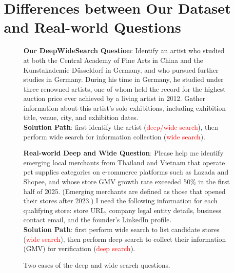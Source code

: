 \documentclass[11pt, letterpaper, logo, onecolumn, copyright, numbering]{paper_improved}
\begin{document}
\section{Differences between Our Dataset and Real-world Questions\label{subsec.limitation}}


\begin{figure}[htbp]
    \begin{tcolorbox}[
        title=Two Deep and Wide Questions,
        colback=yellow!10,
        colbacktitle=black!80,
        coltitle=white,
        arc=1mm,
        boxrule=0pt,
        breakable]
        \textbf{Our DeepWideSearch Question}: Identify an artist who studied at both the Central Academy of Fine Arts in China and the Kunstakademie Düsseldorf in Germany, and who pursued further studies in Germany. During his time in Germany, he studied under three renowned artists, one of whom held the record for the highest auction price ever achieved by a living artist in 2012. Gather information about this artist’s solo exhibitions, including exhibition title, venue, city, and exhibition dates. \\
        \textbf{Solution Path}: first identify the artist (\textcolor{red}{deep/wide search}), then perform wide search for information collection (\textcolor{red}{wide search}).

        \medskip

        \textbf{Real-world Deep and Wide Question}: Please help me identify emerging local merchants from Thailand and Vietnam that operate pet supplies categories on e-commerce platforms such as Lazada and Shopee, and whose store GMV growth rate exceeded 50\% in the first half of 2025. (Emerging merchants are defined as those that opened their stores after 2023.) I need the following information for each qualifying store: store URL, company legal entity details, business contact email, and the founder’s LinkedIn profile.\\
        \textbf{Solution Path}: first perform wide search to list candidate stores (\textcolor{red}{wide search}), then perform deep search to collect their information (GMV) for verification (\textcolor{red}{deep search}).
    \end{tcolorbox}
    \caption{Two cases of the deep and wide search questions.    \label{fig_deepwidesearch_comparison}}
\end{figure}
\end{document}

